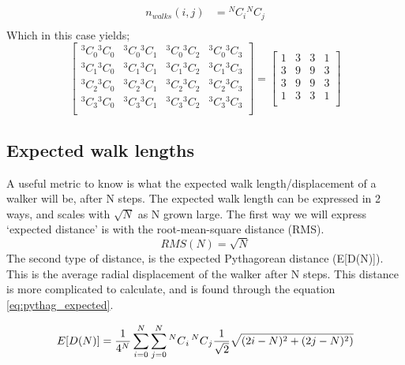 	\begin{align}
		n_{walks}(i,j) &= {}^NC_i {}^NC_j \\ 
		\label{eq:possiblewalks}
	\end{align}
	Which in this case yields;
\[
	\begin{bmatrix}
	{}^3C_0 {}^3C_0   &	{}^3C_0 {}^3C_1   &	{}^3C_0 {}^3C_2   &	{}^3C_0 {}^3C_3   \\
	{}^3C_1 {}^3C_0   &	{}^3C_1 {}^3C_1   &	{}^3C_1 {}^3C_2   &	{}^3C_1 {}^3C_3   \\
	{}^3C_2 {}^3C_0   &	{}^3C_2 {}^3C_1   &	{}^3C_2 {}^3C_2   &	{}^3C_2 {}^3C_3   \\	
	{}^3C_3 {}^3C_0   &	{}^3C_3 {}^3C_1   &	{}^3C_3 {}^3C_2   &	{}^3C_3 {}^3C_3   \\
	\end{bmatrix} 
 = 
	\begin{bmatrix}
	1 & 3 & 3 & 1 \\ 
	3 & 9 & 9 & 3 \\ 
	3 & 9 & 9 & 3 \\ 
	1 & 3 & 3 & 1 \\ 
	\end{bmatrix} 
\]	
	
 	\subsection{Expected walk lengths}
 	A useful metric to know is what the expected walk length/displacement of a walker will be, after N steps. The expected walk length can be expressed in 2 ways, and scales with $\sqrt{N}$ as N grown large. The first way we will express `expected distance' is with the root-mean-square distance (RMS). 
 	\begin{equation}
 	RMS(N) = \sqrt{N}
 	 \end{equation}
 	The second type of distance, is the expected Pythagorean distance (E[D(N)]). This is the average radial displacement of the walker after N steps. This distance is more complicated to calculate, and is found through the equation \ref{eq:pythag_expected}.
 	
 	\begin{equation}
 	E[D(N)] = \frac{1}{4^N}\sum_{i=0}^{N}\sum_{j=0}^{N}\prescript{N}{}{C}_{i}\prescript{N}{}{C}_{j} \frac{1}{\sqrt{2}}\sqrt{(2i-N)^2+(2j-N)^2)} 
 	\label{eq:pythag_expected}
 	\end{equation}
 	
